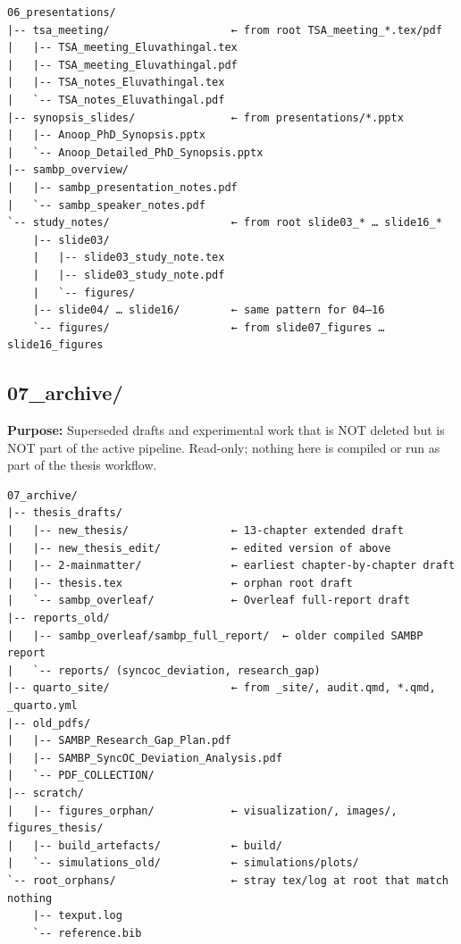 \documentclass[11pt,a4paper]{article}
\begin{document}
\begin{verbatim}
06_presentations/
|-- tsa_meeting/                   ← from root TSA_meeting_*.tex/pdf
|   |-- TSA_meeting_Eluvathingal.tex
|   |-- TSA_meeting_Eluvathingal.pdf
|   |-- TSA_notes_Eluvathingal.tex
|   `-- TSA_notes_Eluvathingal.pdf
|-- synopsis_slides/               ← from presentations/*.pptx
|   |-- Anoop_PhD_Synopsis.pptx
|   `-- Anoop_Detailed_PhD_Synopsis.pptx
|-- sambp_overview/
|   |-- sambp_presentation_notes.pdf
|   `-- sambp_speaker_notes.pdf
`-- study_notes/                   ← from root slide03_* … slide16_*
    |-- slide03/
    |   |-- slide03_study_note.tex
    |   |-- slide03_study_note.pdf
    |   `-- figures/
    |-- slide04/ … slide16/        ← same pattern for 04–16
    `-- figures/                   ← from slide07_figures … slide16_figures
\end{verbatim}

\subsection{07\_archive/}

\begin{yellowbox}
\textbf{Purpose:} Superseded drafts and experimental work that is NOT deleted
but is NOT part of the active pipeline. Read-only; nothing here is compiled or
run as part of the thesis workflow.
\end{yellowbox}

\begin{verbatim}
07_archive/
|-- thesis_drafts/
|   |-- new_thesis/                ← 13-chapter extended draft
|   |-- new_thesis_edit/           ← edited version of above
|   |-- 2-mainmatter/              ← earliest chapter-by-chapter draft
|   |-- thesis.tex                 ← orphan root draft
|   `-- sambp_overleaf/            ← Overleaf full-report draft
|-- reports_old/
|   |-- sambp_overleaf/sambp_full_report/  ← older compiled SAMBP report
|   `-- reports/ (syncoc_deviation, research_gap)
|-- quarto_site/                   ← from _site/, audit.qmd, *.qmd, _quarto.yml
|-- old_pdfs/
|   |-- SAMBP_Research_Gap_Plan.pdf
|   |-- SAMBP_SyncOC_Deviation_Analysis.pdf
|   `-- PDF_COLLECTION/
|-- scratch/
|   |-- figures_orphan/            ← visualization/, images/, figures_thesis/
|   |-- build_artefacts/           ← build/
|   `-- simulations_old/           ← simulations/plots/
`-- root_orphans/                  ← stray tex/log at root that match nothing
    |-- texput.log
    `-- reference.bib
\end{verbatim}
\end{document}
